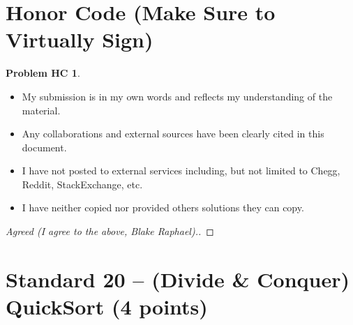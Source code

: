 \documentclass[11pt]{article}
\theoremstyle{definition}
\theoremstyle{definition}
\newtheorem*{requiredHC}{Problem HC}
\theoremstyle{definition}
\begin{document}
\newpage
\section*{Honor Code (Make Sure to Virtually Sign)} \label{HonorCode}
\hypertarget{HonorCode}{}

\begin{requiredHC}
\begin{itemize}
\item My submission is in my own words and reflects my understanding of the material.
\item Any collaborations and external sources have been clearly cited in this document.
\item I have not posted to external services including, but not limited to Chegg, Reddit, StackExchange, etc.
\item I have neither copied nor provided others solutions they can copy.
\end{itemize}

\end{requiredHC}

\begin{proof}[Agreed (I agree to the above, Blake Raphael).]
\end{proof}


\newpage
\setcounter{section}{19}
\section{Standard 20 -- (Divide \& Conquer) QuickSort (4 points)}
\end{document}

